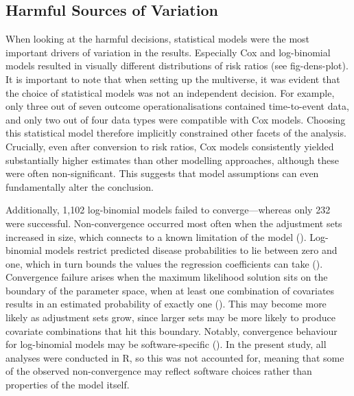 \documentclass[
  man,
  floatsintext,
  longtable,
  nolmodern,
  notxfonts,
  notimes,
  colorlinks=true,linkcolor=blue,citecolor=blue,urlcolor=blue]{apa7}
\begin{document}
\subsection{Harmful Sources of
Variation}\label{harmful-sources-of-variation}

When looking at the harmful decisions, statistical models were the most
important drivers of variation in the results. Especially Cox and
log-binomial models resulted in visually different distributions of risk
ratios (see fig-dens-plot). It is important to note that when setting up
the multiverse, it was evident that the choice of statistical models was
not an independent decision. For example, only three out of seven
outcome operationalisations contained time-to-event data, and only two
out of four data types were compatible with Cox models. Choosing this
statistical model therefore implicitly constrained other facets of the
analysis. Crucially, even after conversion to risk ratios, Cox models
consistently yielded substantially higher estimates than other modelling
approaches, although these were often non-significant. This suggests
that model assumptions can even fundamentally alter the conclusion.

Additionally, 1,102 log-binomial models failed to converge---whereas
only 232 were successful. Non-convergence occurred most often when the
adjustment sets increased in size, which connects to a known limitation
of the model ().
Log-binomial models restrict predicted disease probabilities to lie
between zero and one, which in turn bounds the values the regression
coefficients can take
().
Convergence failure arises when the maximum likelihood solution sits on
the boundary of the parameter space, when at least one combination of
covariates results in an estimated probability of exactly one
(). This may become
more likely as adjustment sets grow, since larger sets may be more
likely to produce covariate combinations that hit this boundary.
Notably, convergence behaviour for log-binomial models may be
software-specific
().
In the present study, all analyses were conducted in R, so this was not
accounted for, meaning that some of the observed non-convergence may
reflect software choices rather than properties of the model itself.
\end{document}
